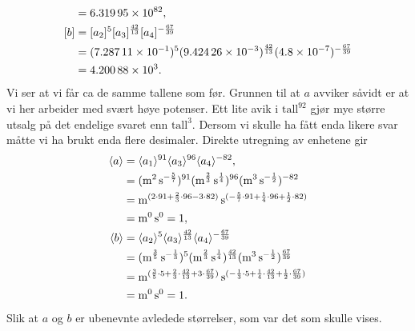 \documentclass[a4paper,11pt]{article}
\begin{document}
\begin{solution}
\begin{align*}
        &= \num{6.31995e82}, \\
        \bpar{b} 
        &= \bpar{a_2}^{5}\bpar{a_3}^{\frac{42}{13}} \bpar{a_4}^{-\frac{67}{39}} \\
        &= (\num{7.28711e-1})^{5}(\num{9.42426e-3})^{\frac{42}{13}} (\num{4.8e-7})^{-\frac{67}{39}} \\
        &= \num{4.20088e3}.
    \end{align*}
    Vi ser at vi får ca de samme tallene som før. Grunnen til at $a$ avviker såvidt
    er at vi her arbeider med svært høye potenser. Ett lite avik i $\text{tall}^{92}$ 
    gjør mye større utsalg på det endelige svaret enn $\text{tall}^3$. Dersom vi skulle ha fått 
    enda likere svar måtte vi ha brukt enda flere desimaler. Direkte utregning av enhetene gir
    \begin{align*}
         \brak{a} 
      &= \brak{a_1}^{91}%
         \brak{a_3}^{96}%
         \brak{a_4}^{-82},\\
      &= (\si{\m\squared\s\tothe{{-\frac{5}{7}}}})^{91}
         (\si{\m\tothe{\frac{2}{3}}\s\tothe{\frac{1}{4}}})^{96}
         (\si{\m\cubed\s\tothe{-\frac{1}{2}}})^{-82} \\
      &= \si{\m\tothe{(2 \cdot 91 + \frac{2}{3}\cdot 96 - 3\cdot 82)}%
             \s\tothe{(-\frac{5}{7} \cdot 91 + \frac{1}{4}\cdot 96 + \frac{1}{2}\cdot 82)}}\\
      &= \si{\m\tothe{0}\s\tothe{0}} = 1,\\
         \brak{b} 
      &= \brak{a_2}^{5}%
         \brak{a_3}^{\frac{42}{13}}%
         \brak{a_4}^{-\frac{67}{39}} \\
      &= (\si{\m\tothe{\frac{3}{5}}\s\tothe{-\frac{1}{3}}})^{5}
         (\si{\m\tothe{\frac{2}{3}}\s\tothe{\frac{1}{4}}})^{\frac{42}{13}}
         (\si{\m\cubed\s\tothe{-\frac{1}{2}}})^{\frac{67}{39}} \\
      &= \si{\m\tothe{(\frac{3}{5} \cdot 5 + \frac{2}{3} \cdot \frac{42}{13} + 3 \cdot \frac{67}{39})}%
             \s\tothe{(-\frac{1}{3} \cdot 5 + \frac{1}{4}\cdot \frac{42}{13} + \frac{1}{2}\cdot \frac{67}{39})}}\\
      &= \si{\m\tothe{0}\s\tothe{0}} = 1.\\
    \end{align*}
    Slik at $a$ og $b$ er ubenevnte avledede størrelser, som var det som skulle vises.
\end{solution}

\end{document}
